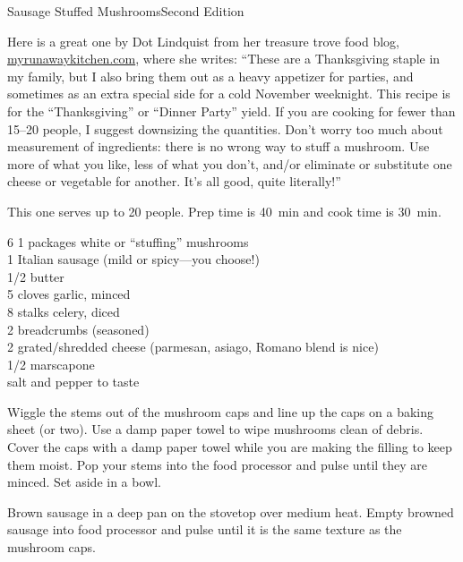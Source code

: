 \begin{entry}{Sausage Stuffed Mushrooms}{Second Edition}

\begin{open}
  Here is a great one by Dot Lindquist from her treasure trove food blog,
  \url{myrunawaykitchen.com}, where she writes: ``These are a Thanksgiving
  staple in my family, but I also bring them out as a heavy appetizer for
  parties, and sometimes as an extra special side for a cold November
  weeknight.  This recipe is for the ``Thanksgiving'' or ``Dinner Party''
  yield.  If you are cooking for fewer than \numrange{15}{20} people, I
  suggest downsizing the quantities.  Don’t worry too much about measurement
  of ingredients: there is no wrong way to stuff a mushroom.  Use more of what
  you like, less of what you don't, and/or eliminate or substitute one cheese
  or vegetable for another.  It's all good, quite literally!''

  This one serves up to 20 people.  Prep time is \SI{40}{\minute} and cook
  time is \SI{30}{\minute}.
\end{open}
\begin{ingredients}
    6 \SI{1}{\quart} packages white or ``stuffing'' mushrooms\\
    \SI{1}{\pound} Italian sausage (mild or spicy---you choose!)\\
    \SI{1/2}{\cup} butter\\
    5 cloves garlic, minced\\
    8 stalks celery, diced\\
    \SI{2}{\cup} breadcrumbs (seasoned)\\
    \SI{2}{\cup} grated/shredded cheese (parmesan, asiago, Romano blend is
    nice)\\
    \SI{1/2}{\cup} marscapone\\
    salt and pepper to taste
\end{ingredients}
Wiggle the stems out of the mushroom caps and line up the caps on a baking sheet
(or two). Use a damp paper towel to wipe mushrooms clean of debris. Cover the
caps with a damp paper towel while you are making the filling to keep them
moist. Pop your stems into the food processor and pulse until they are minced.
Set aside in a bowl.

Brown sausage in a deep pan on the stovetop over medium heat. Empty browned
sausage into food processor and pulse until it is the same texture as the
mushroom caps.


\end{entry}

